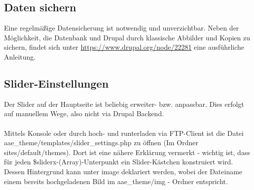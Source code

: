 \documentclass{swp}
\begin{document}
\subsection{Daten sichern}
Eine regelm\"a{\ss}ige Datensicherung ist notwendig und unverzichtbar. Neben der M\"oglichkeit, die Datenbank und Drupal durch klassische Abbilder und Kopien zu sichern, findet sich unter \url{https://www.drupal.org/node/22281} eine ausf\"uhrliche Anleitung.
\subsection{Slider-Einstellungen}
Der Slider auf der Hauptseite ist beliebig erweiter- bzw. anpassbar. Dies erfolgt auf manuellem Wege, also nicht via Drupal Backend.\\\\
Mittels Konsole oder durch hoch- und runterladen via FTP-Client ist die Datei \\aae\_{}theme/templates/slider\_{}settings.php zu \"offnen (Im Ordner \glqq sites/default/themes\grqq{}). Dort ist eine n\"ahere Erkl\"arung vermerkt - wichtig ist, dass für jeden \$sliderx-(Array)-Unterpunkt ein Slider-K\"astchen konstruiert wird. Dessen Hintergrund kann unter \glqq image\grqq{} deklariert werden, wobei der Dateiname einem bereits hochgeladenen Bild im aae\_{}theme/img - Ordner entspricht. 
\end{document}
